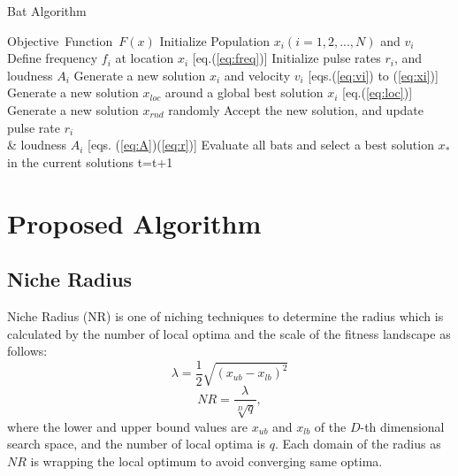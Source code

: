 \documentclass[conference]{IEEEtran}
\begin{document}
\begin{algorithm}[H]
\caption{Bat Algorithm}
\label{code:ba}
\begin{algorithmic}[1]
\REQUIRE Objective\ Function\ $F(x)$
\STATE Initialize Population $x_i(i=1,2,..., N)$ and $v_i$\\
\STATE Define frequency $f_i$ at location $x_i$ [eq.(\ref{eq:freq})]
\STATE Initialize pulse rates $r_i$, and loudness $A_i$
\STATE Generate a new solution $x_i$ and velocity $v_i$ [eqs.(\ref{eq:vi}) to (\ref{eq:xi})]
\STATE Generate a new solution $x_{loc}$ around a global best solution $x_i$ [eq.(\ref{eq:loc})] 
\ENDIF
\STATE Generate a new solution $x_{rnd}$ randomly
\STATE Accept the new solution, and update pulse rate $r_i$ \\ \& loudness $A_i$ [eqs. (\ref{eq:A})(\ref{eq:r})]  
\ENDIF
\STATE Evaluate all bats and select a best solution $x_*$ in the current solutions
\ENDFOR
\STATE t=t+1
\ENDWHILE
\end{algorithmic}
\end{algorithm}

\section{Proposed Algorithm}
\subsection{Niche Radius}
Niche Radius (NR) \cite{Niche}\cite{DNCMA} is one of niching techniques to determine the radius which is calculated by the number of local optima and the scale of the fitness landscape as follows:
\begin{equation}
\label{eq:lambda}
\lambda =\frac{1}{2} \sqrt{(x_{ub}-x_{lb})^2}
\end{equation}
\begin{equation}
\label{eq:NR}
NR=\frac{\lambda}{\sqrt[D]{q}},
\end{equation}
where the lower and upper bound values are $x_{ub}$ and $x_{lb}$ of the $D$-th dimensional search space,   and the number of local optima is $q$. Each domain of the radius as $NR$ is wrapping the local optimum to avoid converging same optima.
\end{document}
